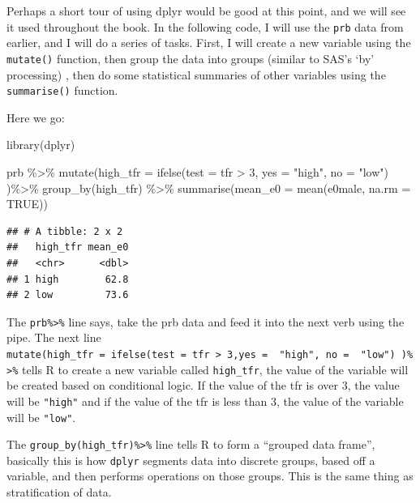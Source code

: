 \documentclass[
]{article}
\newenvironment{Shaded}{\begin{snugshade}}{\end{snugshade}}
\newcommand{\AttributeTok}[1]{\textcolor[rgb]{0.77,0.63,0.00}{#1}}
\newcommand{\ConstantTok}[1]{\textcolor[rgb]{0.00,0.00,0.00}{#1}}
\newcommand{\DecValTok}[1]{\textcolor[rgb]{0.00,0.00,0.81}{#1}}
\newcommand{\FunctionTok}[1]{\textcolor[rgb]{0.00,0.00,0.00}{#1}}
\newcommand{\NormalTok}[1]{#1}
\newcommand{\SpecialCharTok}[1]{\textcolor[rgb]{0.00,0.00,0.00}{#1}}
\newcommand{\StringTok}[1]{\textcolor[rgb]{0.31,0.60,0.02}{#1}}
\begin{document}
Perhaps a short tour of using dplyr would be good at this point, and we
will see it used throughout the book. In the following code, I will use
the \texttt{prb} data from earlier, and I will do a series of tasks. First, I
will create a new variable using the \texttt{mutate()} function, then group the
data into groups (similar to SAS's `by' processing) , then do some
statistical summaries of other variables using the \texttt{summarise()}
function.

Here we go:

\begin{Shaded}
\begin{Highlighting}[]
\FunctionTok{library}\NormalTok{(dplyr)}

\NormalTok{prb }\SpecialCharTok{\%\textgreater{}\%}
  \FunctionTok{mutate}\NormalTok{(}\AttributeTok{high\_tfr =} \FunctionTok{ifelse}\NormalTok{(}\AttributeTok{test =}\NormalTok{ tfr }\SpecialCharTok{\textgreater{}} \DecValTok{3}\NormalTok{,}
                           \AttributeTok{yes =}  \StringTok{"high"}\NormalTok{,}
                           \AttributeTok{no =}  \StringTok{"low"}\NormalTok{) )}\SpecialCharTok{\%\textgreater{}\%}
  \FunctionTok{group\_by}\NormalTok{(high\_tfr) }\SpecialCharTok{\%\textgreater{}\%}
  \FunctionTok{summarise}\NormalTok{(}\AttributeTok{mean\_e0 =} \FunctionTok{mean}\NormalTok{(e0male, }\AttributeTok{na.rm =} \ConstantTok{TRUE}\NormalTok{))}
\end{Highlighting}
\end{Shaded}

\begin{verbatim}
## # A tibble: 2 x 2
##   high_tfr mean_e0
##   <chr>      <dbl>
## 1 high        62.8
## 2 low         73.6
\end{verbatim}

The \texttt{prb\%\textgreater{}\%} line says, take the prb data and feed it into the next verb
using the pipe. The next line
\texttt{mutate(high\_tfr\ =\ ifelse(test\ =\ tfr\ \textgreater{}\ 3,yes\ =\ \ "high",\ no\ =\ \ "low")\ )\%\textgreater{}\%}
tells R to create a new variable called \texttt{high\_tfr}, the value of the
variable will be created based on conditional logic. If the value of the
tfr is over 3, the value will be \texttt{"high"} and if the value of the tfr is
less than 3, the value of the variable will be \texttt{"low"}.

The \texttt{group\_by(high\_tfr)\%\textgreater{}\%} line tells R to form a ``grouped data frame'',
basically this is how \texttt{dplyr} segments data into discrete groups, based
off a variable, and then performs operations on those groups. This is
the same thing as stratification of data.
\end{document}
